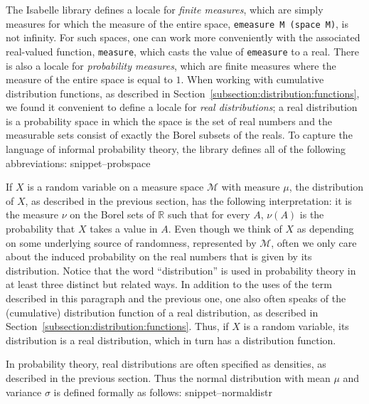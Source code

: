 \documentclass{svjour3}
\newcommand{\RR}{\mathbb{R}}
\newcommand{\mdl}[1]{{\mathcal #1}} %
\newcommand{\Snippet}[1]{\csname snippet--#1\endcsname}
\begin{document}
The Isabelle library defines a locale for \emph{finite measures}, which are simply measures for which the measure of the entire space, \texttt{emeasure M (space M)}, is not infinity. For such spaces, one can work more conveniently with the associated real-valued function, \texttt{measure}, which casts the value of \texttt{emeasure} to a real. There is also a locale for \emph{probability measures}, which are finite measures where the measure of the entire space is equal to $1$. When working with cumulative distribution functions, as described in Section~\ref{subsection:distribution:functions}, we found it convenient to define a locale for \emph{real distributions}; a real distribution is a probability space in which the space is the set of real numbers and the measurable sets consist of exactly the Borel subsets of the reals. To capture the language of informal probability theory, the library defines all of the following abbreviations:
\Snippet{probspace}

If $X$ is a random variable on a measure space $\mdl M$ with measure $\mu$, the distribution of $X$, as described in the previous section, has the following interpretation: it is the measure $\nu$ on the Borel sets of $\RR$ such that for every $A$, $\nu(A)$ is the probability that $X$ takes a value in $A$. Even though we think of $X$ as depending on some underlying source of randomness, represented by $\mdl M$, often we only care about the induced probability on the real numbers that is given by its distribution. Notice that the word ``distribution'' is used in probability theory in at least three distinct but related ways. In addition to the uses of the term described in this paragraph and the previous one, one also often speaks of the (cumulative) distribution function of a real distribution, as described in Section~\ref{subsection:distribution:functions}. Thus, if $X$ is a random variable, its distribution is a real distribution, which in turn has a distribution function.

In probability theory, real distributions are often specified as densities, as described in the previous section. Thus the normal distribution with mean $\mu$ and variance $\sigma$ is defined formally as follows:
\Snippet{normaldistr}
\end{document}
